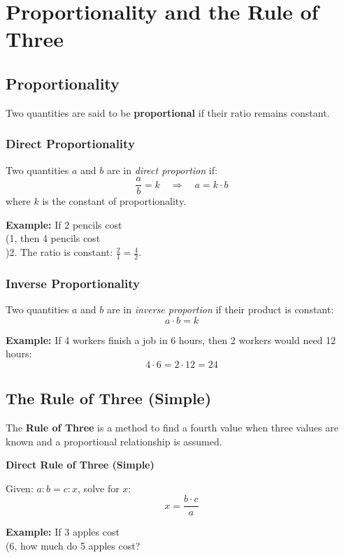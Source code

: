 \section{Proportionality and the Rule of Three}

\subsection{Proportionality}

Two quantities are said to be \textbf{proportional} if their ratio remains constant.

\subsubsection*{Direct Proportionality}

Two quantities \(a\) and \(b\) are in \textit{direct proportion} if:
\[
\frac{a}{b} = k \quad \Rightarrow \quad a = k \cdot b
\]
where \(k\) is the constant of proportionality.

\textbf{Example:} If 2 pencils cost \\(1, then 4 pencils cost \\)2. The ratio is constant: \(\frac{2}{1} = \frac{4}{2}\).

\subsubsection*{Inverse Proportionality}

Two quantities \(a\) and \(b\) are in \textit{inverse proportion} if their product is constant:
\[
a \cdot b = k
\]

\textbf{Example:} If 4 workers finish a job in 6 hours, then 2 workers would need 12 hours:
\[
4 \cdot 6 = 2 \cdot 12 = 24
\]

\subsection{The Rule of Three (Simple)}

The \textbf{Rule of Three} is a method to find a fourth value when three values are known and a proportional relationship is assumed.

\textbf{Direct Rule of Three (Simple)}

Given: \(a : b = c : x\), solve for \(x\):
\[
x = \frac{b \cdot c}{a}
\]

\textbf{Example:} If 3 apples cost \\(6, how much do 5 apples cost?

